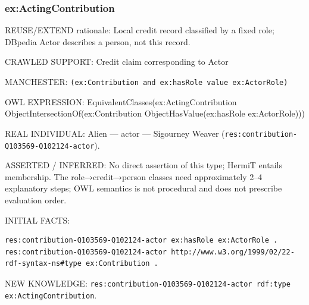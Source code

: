 \documentclass[
  11pt,
]{article}
\begin{document}
\subsubsection{\texorpdfstring{ex:\allowbreak{}\allowbreak{}Actin\allowbreak{}g\allowbreak{}Contrib\allowbreak{}ution}{}}\label{exactingcontribution}

REUSE/EXTEND rationale: Local credit record classified by a fixed role;
DBpedia Actor describes a person, not this record.

CRAWLED SUPPORT: Credit claim correspo\allowbreak{}nding to Actor

MANCHESTER:
\texttt{(ex:\allowbreak{}\allowbreak{}Cont\allowbreak{}ribution\allowbreak{} and ex:\allowbreak{}has\allowbreak{}Role \allowbreak{}value ex\allowbreak{}:\allowbreak{}\allowbreak{}Actor\allowbreak{}Ro\allowbreak{}le)}

OWL EXPRESSION:
Equivale\allowbreak{}nt\allowbreak{}Classe\allowbreak{}s(ex:\allowbreak{}\allowbreak{}Act\allowbreak{}ing\allowbreak{}Contr\allowbreak{}ibution
Object\allowbreak{}In\allowbreak{}tersecti\allowbreak{}on\allowbreak{}Of(ex:\allowbreak{}\allowbreak{}Contribu\allowbreak{}tion
Object\allowbreak{}Ha\allowbreak{}s\allowbreak{}Value(e\allowbreak{}x:\allowbreak{}has\allowbreak{}Rol\allowbreak{}e
ex:\allowbreak{}\allowbreak{}Actor\allowbreak{}\allowbreak{}Role)))

REAL INDIVIDUAL: Alien --- actor --- Sigourney Weaver
(\texttt{res:\allowbreak{}cont\allowbreak{}ribution\allowbreak{}-\allowbreak{}\allowbreak{}Q103569\allowbreak{}-\allowbreak{}\allowbreak{}Q102124\allowbreak{}-\allowbreak{}actor}).

ASSERTED / INFERRED: No direct assertion of this type; HermiT entails
membership. The role→credit→person classes need
approxim\allowbreak{}ately 2--4 explanatory steps; OWL semantics is not
procedural and does not prescribe evaluation order.

INITIAL FACTS:

\begin{verbatim}
res:contribution-Q103569-Q102124-actor ex:hasRole ex:ActorRole .
res:contribution-Q103569-Q102124-actor http://www.w3.org/1999/02/22-rdf-syntax-ns#type ex:Contribution .
\end{verbatim}

NEW KNOWLEDGE:
\texttt{res:\allowbreak{}cont\allowbreak{}ribution\allowbreak{}-\allowbreak{}\allowbreak{}Q103569\allowbreak{}-\allowbreak{}\allowbreak{}Q102124\allowbreak{}-\allowbreak{}actor r\allowbreak{}df:\allowbreak{}type \allowbreak{}ex:\allowbreak{}\allowbreak{}Actin\allowbreak{}g\allowbreak{}Contrib\allowbreak{}ution}.
\end{document}
